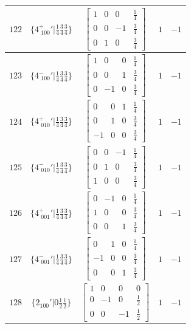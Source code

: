 \documentclass[fleqn,8pt]{jsarticle}
\begin{document}
\begin{longtable}{ccccc}
$ 122 $ & $ \{4^{+}_{\,\,100}{}'|\frac{1}{4} \frac{3}{4} \frac{3}{4}\} $ & $ \begin{bmatrix} 1 & 0 & 0 & \frac{1}{4} \\ 0 & 0 & -1 & \frac{3}{4} \\ 0 & 1 & 0 & \frac{3}{4} \end{bmatrix} $ & $ 1 $ & $ -1 $ \\ \hline
$ 123 $ & $ \{4^{-}_{\,\,100}{}'|\frac{1}{4} \frac{3}{4} \frac{3}{4}\} $ & $ \begin{bmatrix} 1 & 0 & 0 & \frac{1}{4} \\ 0 & 0 & 1 & \frac{3}{4} \\ 0 & -1 & 0 & \frac{3}{4} \end{bmatrix} $ & $ 1 $ & $ -1 $ \\ \hline
$ 124 $ & $ \{4^{+}_{\,\,010}{}'|\frac{1}{4} \frac{3}{4} \frac{3}{4}\} $ & $ \begin{bmatrix} 0 & 0 & 1 & \frac{1}{4} \\ 0 & 1 & 0 & \frac{3}{4} \\ -1 & 0 & 0 & \frac{3}{4} \end{bmatrix} $ & $ 1 $ & $ -1 $ \\ \hline
$ 125 $ & $ \{4^{-}_{\,\,010}{}'|\frac{1}{4} \frac{3}{4} \frac{3}{4}\} $ & $ \begin{bmatrix} 0 & 0 & -1 & \frac{1}{4} \\ 0 & 1 & 0 & \frac{3}{4} \\ 1 & 0 & 0 & \frac{3}{4} \end{bmatrix} $ & $ 1 $ & $ -1 $ \\ \hline
$ 126 $ & $ \{4^{+}_{\,\,001}{}'|\frac{1}{4} \frac{3}{4} \frac{3}{4}\} $ & $ \begin{bmatrix} 0 & -1 & 0 & \frac{1}{4} \\ 1 & 0 & 0 & \frac{3}{4} \\ 0 & 0 & 1 & \frac{3}{4} \end{bmatrix} $ & $ 1 $ & $ -1 $ \\ \hline
$ 127 $ & $ \{4^{-}_{\,\,001}{}'|\frac{1}{4} \frac{3}{4} \frac{3}{4}\} $ & $ \begin{bmatrix} 0 & 1 & 0 & \frac{1}{4} \\ -1 & 0 & 0 & \frac{3}{4} \\ 0 & 0 & 1 & \frac{3}{4} \end{bmatrix} $ & $ 1 $ & $ -1 $ \\ \hline
$ 128 $ & $ \{2{}_{100}{}'|0 \frac{1}{2} \frac{1}{2}\} $ & $ \begin{bmatrix} 1 & 0 & 0 & 0 \\ 0 & -1 & 0 & \frac{1}{2} \\ 0 & 0 & -1 & \frac{1}{2} \end{bmatrix} $ & $ 1 $ & $ -1 $ \\ \hline

\end{longtable}
\end{document}
